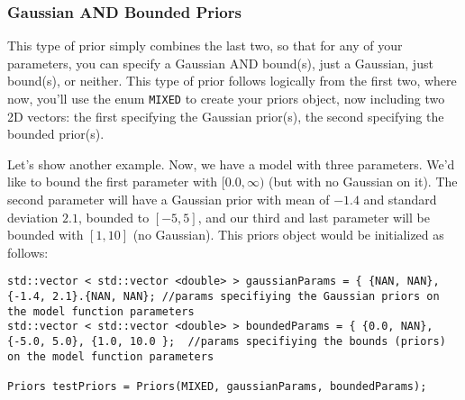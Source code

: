 \documentclass[12pt]{article}
\newcommand{\li}{\lstinline}
\begin{document}
\subsubsection{Gaussian AND Bounded Priors}
\par This type of prior simply combines the last two, so that for any of your parameters, you can specify a Gaussian AND bound(s), just a Gaussian, just bound(s), or neither. This type of prior follows logically from the first two, where now, you'll use the enum \li{MIXED} to create your priors object, now including two 2D vectors: the first specifying the Gaussian prior(s), the second specifying the bounded prior(s).
\par Let's show another example. Now, we have a model with three parameters. We'd like to bound the first parameter with $[0.0,\infty)$ (but with no Gaussian on it). The second parameter will have a Gaussian prior with mean of $-1.4$ and standard deviation $2.1$, bounded to $[-5,5]$, and our third and last parameter will be bounded with $[1, 10]$ (no Gaussian). This priors object would be initialized as follows:
\begin{lstlisting}
std::vector < std::vector <double> > gaussianParams = { {NAN, NAN}, {-1.4, 2.1}.{NAN, NAN}; //params specifiying the Gaussian priors on the model function parameters
std::vector < std::vector <double> > boundedParams = { {0.0, NAN}, {-5.0, 5.0}, {1.0, 10.0 };  //params specifiying the bounds (priors) on the model function parameters

Priors testPriors = Priors(MIXED, gaussianParams, boundedParams);
\end{lstlisting}
\end{document}
